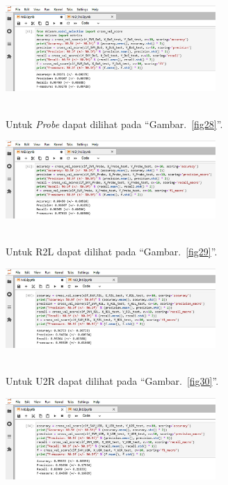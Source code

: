 \documentclass[conference]{IEEEtran}
\begin{document}
\begin{minipage}{\linewidth}
\centerline{\includegraphics[width=80mm]{Gambar/Gbr26.jpg}}
\label{fig27}
\end{minipage}\\

\noindent Untuk \emph{Probe} dapat dilihat pada ``Gambar.~\ref{fig28}''.\\

\begin{minipage}{\linewidth}
\centerline{\includegraphics[width=80mm]{Gambar/Gbr27.jpg}}
\label{fig28}
\end{minipage}\\

\noindent Untuk R2L dapat dilihat pada ``Gambar.~\ref{fig29}''.\\

\begin{minipage}{\linewidth}
\centerline{\includegraphics[width=80mm]{Gambar/Gbr28.jpg}}
\label{fig29}
\end{minipage}\\

\noindent Untuk U2R dapat dilihat pada ``Gambar.~\ref{fig30}''.\\

\begin{minipage}{\linewidth}
\centerline{\includegraphics[width=80mm]{Gambar/Gbr29.jpg}}
\label{fig30}
\end{minipage}\\
\end{document}
